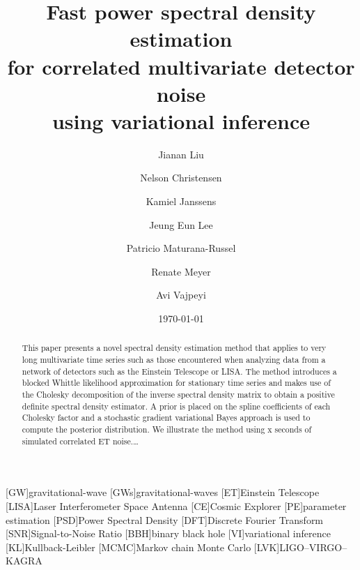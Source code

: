 \documentclass[%
 reprint,
 amsmath,amssymb,
 aps,
]{revtex4-2}
\begin{document}


\title{
Fast power spectral density estimation \\
for correlated multivariate detector noise \\
using variational inference
}%

\author{Jianan Liu}
\author{Nelson Christensen}
\author{Kamiel Janssens}%
\author{Jeung Eun Lee}
\author{Patricio Maturana-Russel}
\author{Renate Meyer}
\author{Avi Vajpeyi}

%

\date{\today}%

\begin{abstract}
 This paper presents a novel spectral density estimation method that applies to very long multivariate time series such as those encountered when analyzing data from a network of detectors such as the Einstein Telescope or LISA. The method introduces a blocked Whittle likelihood approximation for stationary time series and makes use of the Cholesky decomposition of the inverse spectral density matrix to obtain a positive definite spectral density estimator. A prior is placed on the spline coefficients of each Cholesky factor and a stochastic gradient variational Bayes approach is used to compute the posterior distribution. We illustrate the method using x seconds of simulated correlated ET noise.\ldots
\end{abstract}

\maketitle


\begin{acronym}
    [GW]{gravitational-wave}
    [GWs]{gravitational-waves}
    [ET]{Einstein Telescope}
    [LISA]{Laser Interferometer Space Antenna}
    [CE]{Cosmic Explorer}
    [PE]{parameter estimation}
    [PSD]{Power Spectral Density}
    [DFT]{Discrete Fourier Transform}
    [SNR]{Signal-to-Noise Ratio}
    [BBH]{binary black hole}
    [VI]{variational inference}
    [KL]{Kullback-Leibler}
    [MCMC]{Markov chain Monte Carlo}
    [LVK]{LIGO--VIRGO--KAGRA}
\end{acronym}
\end{document}
